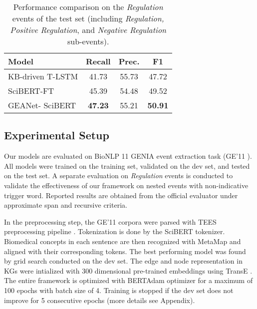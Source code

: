 \documentclass[11pt,a4paper]{article}
\newcommand{\GAENet}{\textrm{GEANet}}
\newcommand{\GE}{\textrm{{\fontfamily{qcr}\selectfont GE'11} }}
\begin{document}
\begin{table}[t]
\small
\centering
\begin{tabular}{@{\ \ }l|c@{\ \ }c@{\ \ }c@{\ \ }}
\hline \textbf{Model} & \textbf{Recall}  & \textbf{Prec.}  & \textbf{F1} \\
\hline

 KB-driven T-LSTM  & 41.73 & 55.73  & 47.72 \\
\hline
\hline

 SciBERT-FT  & 45.39 & 54.48 & 49.52 \\
 \GAENet- SciBERT  & \textbf{47.23} &  55.21 & \textbf{50.91} \\


\hline
\end{tabular}
\caption{\label{font-table} Performance comparison on the \textit{Regulation} events of the test set (including \textit{Regulation, Positive Regulation}, and \textit{Negative Regulation} sub-events). }
\label{regulation_comparison}
\vspace{-1em}
\end{table}































\subsection{Experimental Setup} \label{sec:setup}
Our models are evaluated on BioNLP 11 GENIA event extraction task (\GE). All models were trained on the training set, validated on the dev set, and tested on the test set. A separate evaluation on \textit{Regulation} events is conducted to validate the effectiveness of our framework on nested events with non-indicative trigger word. Reported results are obtained from the official evaluator under approximate span and recursive criteria.


In the preprocessing step, the \GE{} corpora were parsed with TEES preprocessing pipeline \cite{bjorne-salakoski-2018-biomedical}. Tokenization is done by the SciBERT tokenizer. Biomedical concepts in each sentence are then recognized with MetaMap and aligned with their corresponding tokens. The best performing model was found by grid search conducted on the dev set. The edge and node representation in KGs were intialized with 300 dimensional pre-trained embeddings using TransE \cite{wang2014knowledge}. The entire framework is optimized with BERTAdam optimizer for a maximum of 100 epochs with batch size of 4. Training is stopped if the dev set  does not improve for 5 consecutive epochs (more details see Appendix). 
\end{document}
